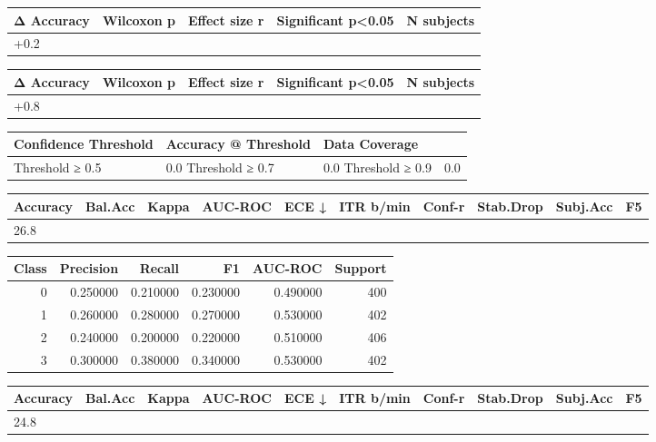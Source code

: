 \begin{tabular}{lrrll}
\toprule
Δ Accuracy & Wilcoxon p & Effect size r & Significant p<0.05 & N subjects \\
\midrule
+0.2%
\bottomrule
\end{tabular}


\begin{tabular}{lrrll}
\toprule
Δ Accuracy & Wilcoxon p & Effect size r & Significant p<0.05 & N subjects \\
\midrule
+0.8%
\bottomrule
\end{tabular}


\begin{tabular}{lll}
\toprule
Confidence Threshold & Accuracy @ Threshold & Data Coverage \\
\midrule
Threshold ≥ 0.5 & 0.0%
Threshold ≥ 0.7 & 0.0%
Threshold ≥ 0.9 & 0.0%
\bottomrule
\end{tabular}


\begin{tabular}{llrrrrrlll}
\toprule
Accuracy & Bal.Acc & Kappa & AUC-ROC & ECE ↓ & ITR b/min & Conf-r & Stab.Drop & Subj.Acc & F5 \\
\midrule
26.8%
\bottomrule
\end{tabular}


\begin{tabular}{rrrrrr}
\toprule
Class & Precision & Recall & F1 & AUC-ROC & Support \\
\midrule
0 & 0.250000 & 0.210000 & 0.230000 & 0.490000 & 400 \\
1 & 0.260000 & 0.280000 & 0.270000 & 0.530000 & 402 \\
2 & 0.240000 & 0.200000 & 0.220000 & 0.510000 & 406 \\
3 & 0.300000 & 0.380000 & 0.340000 & 0.530000 & 402 \\
\bottomrule
\end{tabular}


\begin{tabular}{llrrrrrlll}
\toprule
Accuracy & Bal.Acc & Kappa & AUC-ROC & ECE ↓ & ITR b/min & Conf-r & Stab.Drop & Subj.Acc & F5 \\
\midrule
24.8%
\bottomrule
\end{tabular}


